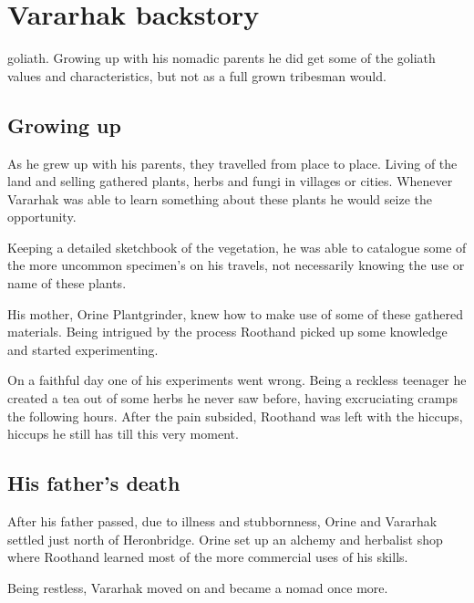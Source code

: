 \chapter{Vararhak backstory}
\label{background}

 goliath. Growing up with his nomadic parents he did get some of the goliath values and characteristics, but not as a full grown tribesman would.

\section{Growing up}
As he grew up with his parents, they travelled from place to place. Living of the land and selling gathered plants, herbs and fungi in villages or cities. Whenever Vararhak was able to learn something about these plants he would seize the opportunity.

Keeping a detailed sketchbook of the vegetation, he was able to catalogue some of the more uncommon specimen's on his travels, not necessarily knowing the use or name of these plants.

His mother, Orine Plantgrinder, knew how to make use of some of these gathered materials. Being intrigued by the process Roothand picked up some knowledge and started experimenting.

On a faithful day one of his experiments went wrong. Being a reckless teenager he created a tea out of some herbs he never saw before, having excruciating cramps the following hours. After the pain subsided, Roothand was left with the hiccups, hiccups he still has till this very moment.

\section{His father's death}
After his father passed, due to illness and stubbornness, Orine and Vararhak settled just north of Heronbridge. Orine set up an alchemy and herbalist shop where Roothand learned most of the more commercial uses of his skills.

Being restless, Vararhak moved on and became a nomad once more.


